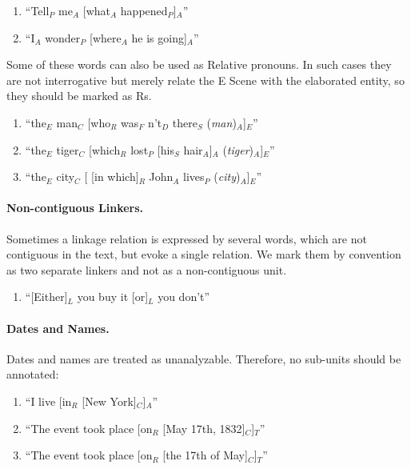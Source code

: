\documentclass[11pt]{article}
\newcommand{\be}{\begin{enumerate}}
\newcommand{\ee}{\end{enumerate}}
\newcommand{\orig}[1]{{\color{red} {#1}}}
\newcommand{\rem}[1]{{(\it #1})}
\begin{document}
\be
\item 
``Tell$_P$ me$_A$ [what$_A$ happened$_P$]$_A$''
\item
``I$_A$ wonder$_P$ [where$_A$ he is going]$_A$''
\ee

\noindent
Some of these words can also be used as Relative pronouns. In such cases they are not interrogative but merely 
relate the E Scene with the elaborated entity, so they should be marked as Rs.

\be
\item
``the$_E$ man$_C$ [who$_R$ was$_F$ n't$_D$ there$_{S}$ \rem{man}$_A$]$_{E}$''

\item
``the$_E$ tiger$_C$ [which$_R$ lost$_P$ [his$_S$ hair$_A$]$_A$ \rem{tiger}$_A$]$_{E}$''
\item
``the$_E$ city$_C$ [ [in which]$_R$ John$_A$ lives$_P$ \rem{city}$_A$]$_{E}$''
\ee



\paragraph{Non-contiguous Linkers.} 
Sometimes a linkage relation is expressed by several words, which are not contiguous in the text, but evoke a single relation. We mark them by convention as two separate linkers and not as a non-contiguous unit.
\be \item
``[Either]$_L$ you buy it [or]$_L$ you don't''
\ee

\paragraph{Dates and Names.} Dates and names are treated as unanalyzable. Therefore, no sub-units should be annotated:
\be \item
``I live [in$_R$ [New York]$_C$]$_A$''
\item
``The event took place [on$_R$ [May 17th, 1832]$_C$]$_T$''
\item
``The event took place [on$_R$ [the 17th of May]$_C$]$_T$''
\ee
\end{document}
